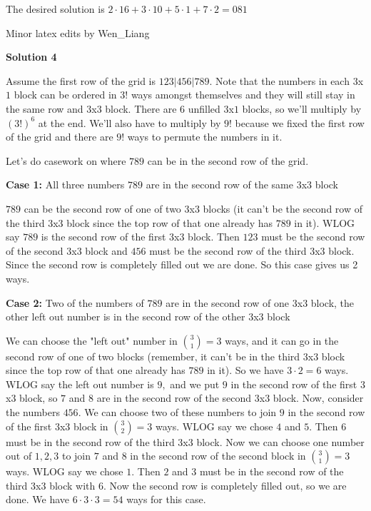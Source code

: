 \begin{enumerate}
 The desired solution is $2\cdot16 + 3\cdot10 + 5\cdot1 + 7\cdot2 = \boxed{081}$

 Minor latex edits by Wen\_Liang

 



\textbf{Solution 4}

Assume the first row of the grid is $123|456|789.$ Note that the numbers in each $3$x$1$ block can be ordered in $3!$ ways amongst themselves and they will still stay in the same row and $3$x$3$ block. There are $6$ unfilled $3$x$1$ blocks, so we'll multiply by $(3!)^6$ at the end. We’ll also have to multiply by $9!$ because we fixed the first row of the grid and there are $9!$ ways to permute the numbers in it.

 Let's do casework on where $789$ can be in the second row of the grid. 

 \textbf{Case 1:} All three numbers $789$ are in the second row of the same $3$x$3$ block 

 $789$ can be the second row of one of two $3$x$3$ blocks (it can't be the second row of the third $3$x$3$ block since the top row of that one already has $789$ in it). WLOG say $789$ is the second row of the first $3$x$3$ block. Then $123$ must be the second row of the second $3$x$3$ block and $456$ must be the second row of the third $3$x$3$ block. Since the second row is completely filled out we are done. So this case gives us 2 ways. 

 
\textbf{Case 2:} Two of the numbers of $789$ are in the second row of one $3$x$3$ block, the other left out number is in the second row of the other $3$x$3$ block

 We can choose the "left out" number in $\binom{3}{1} = 3$ ways, and it can go in the second row of one of two blocks (remember, it can't be in the third $3$x$3$ block since the top row of that one already has $789$ in it). So we have $3\cdot 2 = 6$ ways. WLOG say the left out number is $9,$ and we put $9$ in the second row of the first $3$x$3$ block, so $7$ and $8$ are in the second row of the second $3$x$3$ block. Now, consider the numbers $456.$ We can choose two of these numbers to join $9$ in the second row of the first $3$x$3$ block in $\binom{3}{2} = 3$ ways. WLOG say we chose $4$ and $5$. Then $6$ must be in the second row of the third $3$x$3$ block. Now we can choose one number out of $1,2,3$ to join $7$ and $8$ in the second row of the second block in $\binom{3}{1} = 3$ ways. WLOG say we chose $1.$ Then $2$ and $3$ must be in the second row of the third $3$x$3$ block with $6.$ Now the second row is completely filled out, so we are done. We have $6 \cdot 3 \cdot 3 = 54$ ways for this case. 


\end{enumerate}
